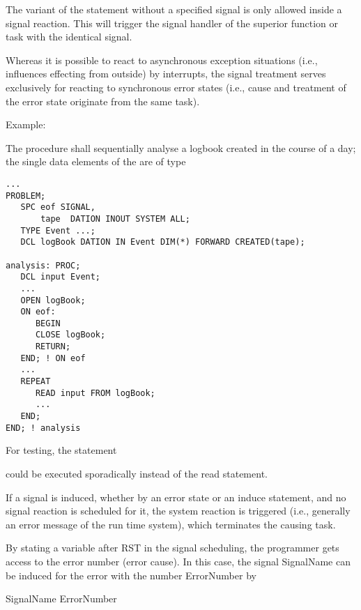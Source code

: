 The variant of the  statement without a specified signal is 
only allowed inside a signal reaction. This will trigger the signal handler
of the superior function or task with the identical signal.


Whereas it is possible to react to asynchronous exception situations
(i.e., influences effecting from outside) by interrupts, the signal
treatment serves exclusively for reacting to synchronous error states
(i.e., cause and treatment of the error state originate from the same
task).

Example:

The procedure  shall sequentially analyse a logbook created
in the course of a day; the single data elements of the  are of
type 

\begin{lstlisting}
...
PROBLEM;
   SPC eof SIGNAL,
       tape  DATION INOUT SYSTEM ALL;
   TYPE Event ...;
   DCL logBook DATION IN Event DIM(*) FORWARD CREATED(tape);

analysis: PROC;
   DCL input Event;
   ...
   OPEN logBook;
   ON eof:
      BEGIN
      CLOSE logBook;
      RETURN;
   END; ! ON eof
   ...
   REPEAT
      READ input FROM logBook;
      ...
   END;
END; ! analysis
\end{lstlisting}

For testing, the statement


could be executed sporadically instead of the read statement.



If a signal is induced, whether by an error state or an induce
statement, and no signal reaction is scheduled for it, the system
reaction is triggered (i.e., generally an error message of the run time
system), which terminates the causing task.

By stating a variable after RST in the signal scheduling, the programmer
gets access to the error number (error cause). In this case, the signal
SignalName can be induced for the error with the number ErrorNumber by

 SignalName  \kw{(} ErrorNumber \kw{)} \kw{;}


